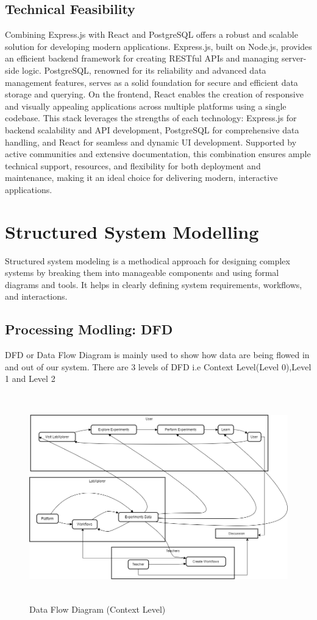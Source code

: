 \subsection{Technical Feasibility}
Combining Express.js with React and PostgreSQL offers a robust and scalable solution for developing modern applications. Express.js, built on Node.js, provides an efficient backend framework for creating RESTful APIs and managing server-side logic. PostgreSQL, renowned for its reliability and advanced data management features, serves as a solid foundation for secure and efficient data storage and querying. On the frontend, React enables the creation of responsive and visually appealing applications across multiple platforms using a single codebase. This stack leverages the strengths of each technology: Express.js for backend scalability and API development, PostgreSQL for comprehensive data handling, and React for seamless and dynamic UI development. Supported by active communities and extensive documentation, this combination ensures ample technical support, resources, and flexibility for both deployment and maintenance, making it an ideal choice for delivering modern, interactive applications.
\section{Structured System Modelling }
Structured system modeling is a methodical approach for designing complex systems by breaking them into manageable components and using formal diagrams and tools. It helps in clearly defining system requirements, workflows, and interactions.
\subsection{Processing Modling: DFD}
DFD or Data Flow Diagram is mainly used to show how data are being flowed in and out of our system. There are 3 levels of DFD i.e Context Level(Level 0),Level 1 and Level 2
\begin{figure}[H]
    \centering
    \includegraphics[height = 9cm]{Diagrams/DFD.drawio.png}
    \caption{Data Flow Diagram (Context Level)}
\end{figure}
\newpage
